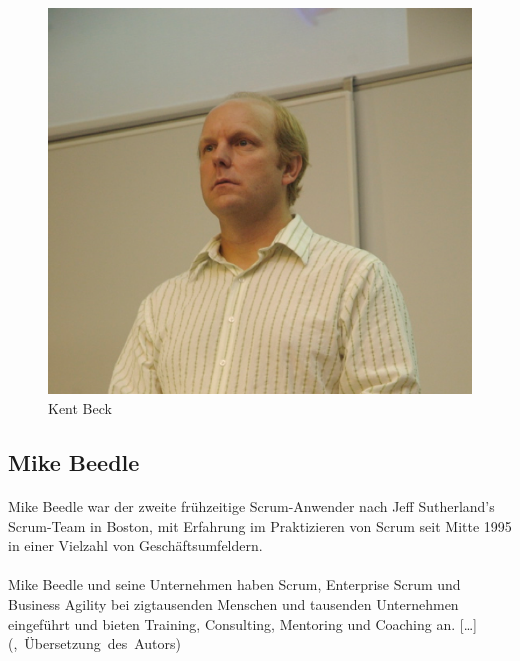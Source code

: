 \documentclass{article}
\begin{document}
\begin{figure}[h]
  \centering
  \includegraphics[scale=.75]{img/kent.png}
  \caption{Kent Beck}
  \label{kentpng}
\end{figure}

\subsection{Mike Beedle}
\paragraph{}
Mike Beedle war der zweite frühzeitige Scrum-Anwender nach Jeff Sutherland’s Scrum-Team in Boston, mit Erfahrung im Praktizieren von Scrum seit Mitte 1995 in einer Vielzahl von Geschäftsumfeldern.

\paragraph{}
Mike Beedle und seine Unternehmen haben Scrum, Enterprise Scrum und Business Agility bei zigtausenden Menschen und tausenden Unternehmen eingeführt und bieten Training, Consulting, Mentoring und Coaching an.
[\ldots] (\cite[Buchrückseite]{beck2},~Übersetzung~des~Autors)
\end{document}
